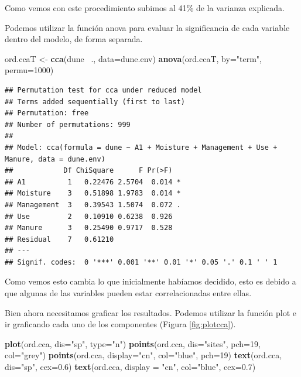 \documentclass[]{book}
\newenvironment{Shaded}{\begin{snugshade}}{\end{snugshade}}
\newcommand{\KeywordTok}[1]{\textcolor[rgb]{0.13,0.29,0.53}{\textbf{{#1}}}}
\newcommand{\DataTypeTok}[1]{\textcolor[rgb]{0.13,0.29,0.53}{{#1}}}
\newcommand{\DecValTok}[1]{\textcolor[rgb]{0.00,0.00,0.81}{{#1}}}
\newcommand{\FloatTok}[1]{\textcolor[rgb]{0.00,0.00,0.81}{{#1}}}
\newcommand{\StringTok}[1]{\textcolor[rgb]{0.31,0.60,0.02}{{#1}}}
\newcommand{\NormalTok}[1]{{#1}}
\begin{document}
Como vemos con este procedimiento subimos al 41\% de la varianza
explicada.

Podemos utilizar la función anova para evaluar la significancia de cada
variable dentro del modelo, de forma separada.

\begin{Shaded}
\begin{Highlighting}[]
\NormalTok{ord.ccaT <-}\StringTok{ }\KeywordTok{cca}\NormalTok{(dune~}\StringTok{ }\NormalTok{., }\DataTypeTok{data=}\NormalTok{dune.env)}
\KeywordTok{anova}\NormalTok{(ord.ccaT, }\DataTypeTok{by=}\StringTok{"term"}\NormalTok{, }\DataTypeTok{permu=}\DecValTok{1000}\NormalTok{)}
\end{Highlighting}
\end{Shaded}

\begin{verbatim}
## Permutation test for cca under reduced model
## Terms added sequentially (first to last)
## Permutation: free
## Number of permutations: 999
## 
## Model: cca(formula = dune ~ A1 + Moisture + Management + Use + Manure, data = dune.env)
##            Df ChiSquare      F Pr(>F)  
## A1          1   0.22476 2.5704  0.014 *
## Moisture    3   0.51898 1.9783  0.014 *
## Management  3   0.39543 1.5074  0.072 .
## Use         2   0.10910 0.6238  0.926  
## Manure      3   0.25490 0.9717  0.528  
## Residual    7   0.61210                
## ---
## Signif. codes:  0 '***' 0.001 '**' 0.01 '*' 0.05 '.' 0.1 ' ' 1
\end{verbatim}

Como vemos esto cambia lo que inicialmente habíamos decidido, esto es
debido a que algunas de las variables pueden estar correlacionadas entre
ellas.

Bien ahora necesitamos graficar los resultados. Podemos utilizar la
función plot e ir graficando cada uno de los componentes (Figura
\ref{fig:plotcca}).

\begin{Shaded}
\begin{Highlighting}[]
\KeywordTok{plot}\NormalTok{(ord.cca, }\DataTypeTok{dis=}\StringTok{"sp"}\NormalTok{, }\DataTypeTok{type=}\StringTok{"n"}\NormalTok{)}
\KeywordTok{points}\NormalTok{(ord.cca, }\DataTypeTok{dis=}\StringTok{"sites"}\NormalTok{, }\DataTypeTok{pch=}\DecValTok{19}\NormalTok{, }\DataTypeTok{col=}\StringTok{"grey"}\NormalTok{)}
\KeywordTok{points}\NormalTok{(ord.cca, }\DataTypeTok{display=}\StringTok{"cn"}\NormalTok{, }\DataTypeTok{col=}\StringTok{"blue"}\NormalTok{, }\DataTypeTok{pch=}\DecValTok{19}\NormalTok{)}
\KeywordTok{text}\NormalTok{(ord.cca, }\DataTypeTok{dis=}\StringTok{"sp"}\NormalTok{, }\DataTypeTok{cex=}\FloatTok{0.6}\NormalTok{)}
\KeywordTok{text}\NormalTok{(ord.cca, }\DataTypeTok{display =} \StringTok{"cn"}\NormalTok{, }\DataTypeTok{col=}\StringTok{"blue"}\NormalTok{, }\DataTypeTok{cex=}\FloatTok{0.7}\NormalTok{)}
\end{Highlighting}
\end{Shaded}
\end{document}
